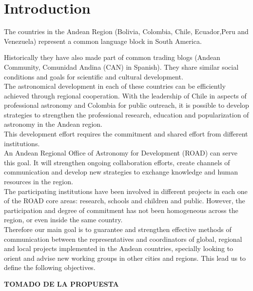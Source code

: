 \newpage
\section{Introduction}

The countries in the Andean Region (Bolivia, Colombia, Chile, Ecuador,Peru and Venezuela) represent a common language block in South America.
 
Historically they have also made part of common trading blogs (Andean Community, Comunidad Andina (CAN) in Spanish).
They share similar social conditions and goals for scientific and cultural development.
\\

The astronomical development in each of these countries can be efficiently achieved through regional cooperation. With the leadership of Chile in aspects of professional astronomy and Colombia for public outreach, it is possible to develop strategies to strengthen the professional research, education and popularization of astronomy in the Andean region.
\\

This development effort requires the commitment and shared effort from different institutions.
\\

An Andean Regional Office of Astronomy for Development (ROAD) can serve this goal. It will strengthen ongoing collaboration efforts, create channels of communication and develop new strategies to exchange knowledge and human resources in the region. 
\\

The participating institutions have been involved in different projects in each one of the ROAD core areas: research, schools and children and public. However, the participation and degree of commitment has not been homogeneous across the region, or even inside the same country.
\\

Therefore our main goal is to guarantee and strengthen effective methods of communication between the representatives and coordinators of global, regional and local projects implemented in the Andean countries, specially looking to orient and advise new working groups
in other cities and regions. This lead us to define the following objectives.
 


\textbf{TOMADO DE LA PROPUESTA}
